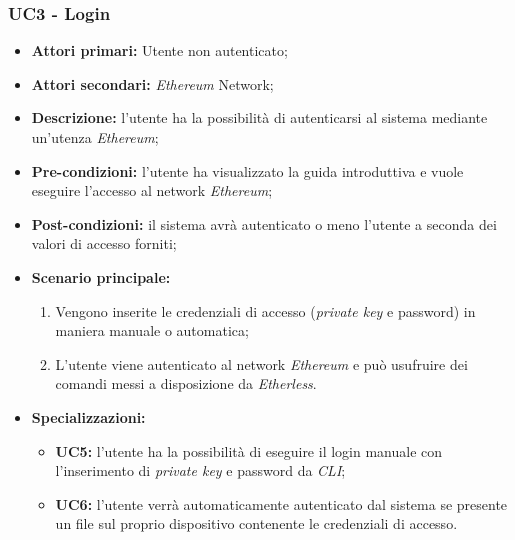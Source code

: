 \subsubsection{UC3 - Login}
\begin{itemize}
	\item \textbf{Attori primari:} Utente non autenticato;
	\item \textbf{Attori secondari:} \textit{Ethereum\glo} Network;
	\item \textbf{Descrizione:} l'utente ha la possibilità di autenticarsi al sistema mediante un'utenza \textit{Ethereum\glos}; 
	\item \textbf{Pre-condizioni:} l'utente ha visualizzato la guida introduttiva e vuole eseguire l'accesso al network \textit{Ethereum\glos};
	\item \textbf{Post-condizioni:} il sistema avrà autenticato o meno l'utente a seconda dei valori di accesso forniti;
	\item \textbf{Scenario principale:} 
	\begin{enumerate}
		\item Vengono inserite le credenziali di accesso (\textit{private key\glos} e password) in maniera manuale o automatica;
		\item L'utente viene autenticato al network \textit{Ethereum\glo} e può usufruire dei comandi messi a disposizione da \textit{Etherless}.
	\end{enumerate}
	\item \textbf{Specializzazioni:}
	\begin{itemize}
		\item \textbf{UC5:} l'utente ha la possibilità di eseguire il login manuale con l'inserimento di \textit{private key\glo} e password da \textit{CLI\glos};
		\item \textbf{UC6:} l'utente verrà automaticamente autenticato dal sistema se presente un file sul proprio dispositivo contenente le credenziali di accesso.  
	\end{itemize}
\end{itemize}

